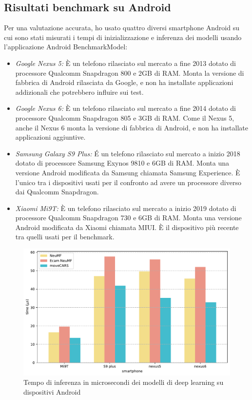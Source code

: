 \documentclass[12pt,italian]{report}
\begin{document}
\subsection{Risultati benchmark su Android}
\noindent Per una valutazione accurata, ho usato quattro diversi smartphone Android su cui sono stati misurati i tempi di inizializzazione e inferenza dei modelli usando l'applicazione Android BenchmarkModel:
\begin{itemize}
\item \textit{Google Nexus 5:} \`E un telefono rilasciato sul mercato a fine 2013 dotato di processore Qualcomm Snapdragon 800 e 2GB di RAM. Monta la versione di fabbrica di Android rilasciata da Google, e non ha installate applicazioni addizionali che potrebbero influire sui test.

\item \textit{Google Nexus 6:} \`E un telefono rilasciato sul mercato a fine 2014 dotato di processore Qualcomm Snapdragon 805 e 3GB di RAM. Come il Nexus 5, anche il Nexus 6 monta la versione di fabbrica di Android, e non ha installate applicazioni aggiuntive.

\item \textit{Samsung Galaxy S9 Plus:} \'E un telefono rilasciato sul mercato a inizio 2018 dotato di processore Samsung Exynos 9810 e 6GB di RAM. Monta una versione Android modificata da Samsung chiamata Samsung Experience. \`E l'unico tra i dispositivi usati per il confronto ad avere un processore diverso dai Qualcomm Snapdragon.

\item \textit{Xiaomi Mi9T:} \`E un telefono rilasciato sul mercato a inizio 2019 dotato di processore Qualcomm Snapdragon 730  e 6GB di RAM. Monta una versione Android modificata da Xiaomi chiamata MIUI. \`E il dispositivo più recente tra quelli usati per il benchmark.
\end{itemize}

\begin{figure}
  \centering
  \includegraphics[width=\linewidth]{immagini/inference_tflite.pdf}
  \caption{Tempo di inferenza in microsecondi dei modelli di deep learning su dispositivi Android}
  \label{fig:inference-time}
\end{figure} 
\end{document}
